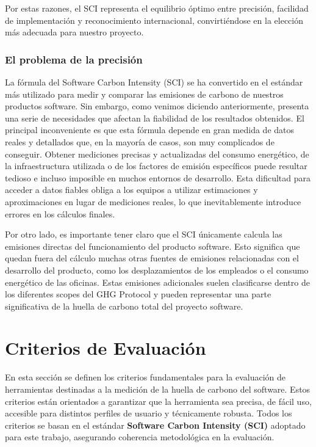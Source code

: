 \documentclass[12pt,a4paper]{report}
\begin{document}
Por estas razones, el SCI representa el equilibrio óptimo entre precisión, facilidad de implementación y reconocimiento internacional, convirtiéndose en la elección más adecuada para nuestro proyecto.

\subsubsection{El problema de la precisión}

La fórmula del Software Carbon Intensity (SCI) se ha convertido en el estándar más utilizado para medir y comparar las emisiones de carbono de nuestros productos software. Sin embargo, como venimos diciendo anteriormente, presenta una serie de necesidades que afectan la fiabilidad de los resultados obtenidos. El principal inconveniente es que esta fórmula depende en gran medida de datos reales y detallados que, en la mayoría de casos, son muy complicados de conseguir. Obtener mediciones precisas y actualizadas del consumo energético, de la infraestructura utilizada o de los factores de emisión específicos puede resultar tedioso e incluso imposible en muchos entornos de desarrollo. Esta dificultad para acceder a datos fiables obliga a los equipos a utilizar estimaciones y aproximaciones en lugar de mediciones reales, lo que inevitablemente introduce errores en los cálculos finales.

Por otro lado, es importante tener claro que el SCI únicamente calcula las emisiones directas del funcionamiento del producto software. Esto significa que quedan fuera del cálculo muchas otras fuentes de emisiones relacionadas con el desarrollo del producto, como los desplazamientos de los empleados o el consumo energético de las oficinas. Estas emisiones adicionales suelen clasificarse dentro de los diferentes scopes del GHG Protocol y pueden representar una parte significativa de la huella de carbono total del proyecto software.

\section{Criterios de Evaluación}

En esta sección se definen los criterios fundamentales para la evaluación de herramientas destinadas a la medición de la huella de carbono del software. Estos criterios están orientados a garantizar que la herramienta sea precisa, de fácil uso, accesible para distintos perfiles de usuario y técnicamente robusta. Todos los criterios se basan en el estándar \textbf{Software Carbon Intensity (SCI)} adoptado para este trabajo, asegurando coherencia metodológica en la evaluación.
\end{document}
